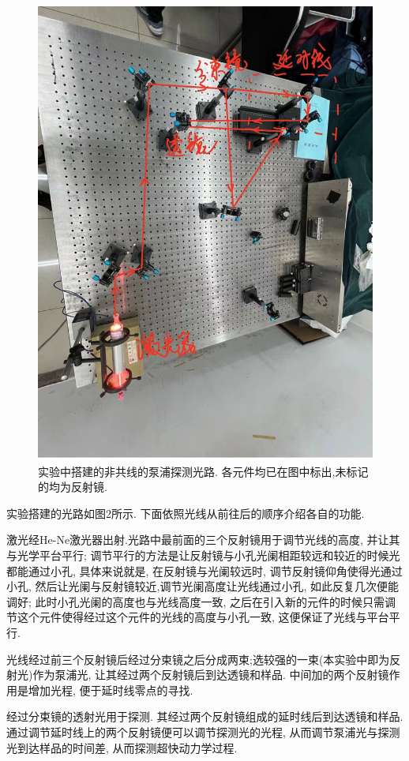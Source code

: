 \documentclass[aps,pre,12pt,preprint,%
	onecolumn,showpacs,showkeys,nofootinbib]{revtex4-2}
\begin{document}
	\begin{figure}[!h]
	\centering
	\includegraphics[width=.8\linewidth]{img/2.jpg}
	\caption[实验中搭建的非共线的泵浦探测光路. 各元件均已在图中标出,未标记的均为反射镜.
    ]{实验中搭建的非共线的泵浦探测光路. 各元件均已在图中标出,未标记的均为反射镜.
    }\vspace{1ex}
	\end{figure}
    \par 实验搭建的光路如图2所示. 下面依照光线从前往后的顺序介绍各自的功能.
    \par 激光经He-Ne激光器出射.光路中最前面的三个反射镜用于调节光线的高度, 并让其与光学平台平行; 调节平行的方法是让反射镜与小孔光阑相距较远和较近的时候光都能通过小孔, 具体来说就是, 在反射镜与光阑较远时, 调节反射镜仰角使得光通过小孔, 然后让光阑与反射镜较近,调节光阑高度让光线通过小孔, 如此反复几次便能调好; 此时小孔光阑的高度也与光线高度一致, 之后在引入新的元件的时候只需调节这个元件使得经过这个元件的光线的高度与小孔一致, 这便保证了光线与平台平行.
    \par 光线经过前三个反射镜后经过分束镜之后分成两束;选较强的一束(本实验中即为反射光)作为泵浦光, 让其经过两个反射镜后到达透镜和样品. 中间加的两个反射镜作用是增加光程, 便于延时线零点的寻找.
    \par 经过分束镜的透射光用于探测. 其经过两个反射镜组成的延时线后到达透镜和样品. 通过调节延时线上的两个反射镜便可以调节探测光的光程, 从而调节泵浦光与探测光到达样品的时间差, 从而探测超快动力学过程.
\end{document}
